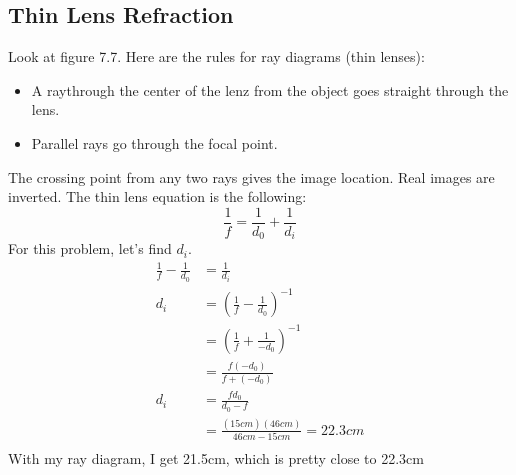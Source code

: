     \subsection{Thin Lens Refraction}
    Look at figure 7.7. Here are the rules for ray diagrams (thin lenses):
    \begin{itemize}
        \item A raythrough the center of the lenz from the object goes straight through the lens.
        \item Parallel rays go through the focal point.
    \end{itemize}
    The crossing point from any two rays gives the image location. Real images are inverted. The thin lens equation is the following:
    \begin{equation*}
        \frac{1}{f}=\frac{1}{d_0}+\frac{1}{d_i}
    \end{equation*}
    For this problem, let's find $d_i$.
    \begin{align*}
        \frac{1}{f}-\frac{1}{d_0}&=\frac{1}{d_i}\\
        d_i&=\left(\frac{1}{f}-\frac{1}{d_0}\right)^{-1}\\
        &=\left(\frac{1}{f}+\frac{1}{-d_0}\right)^{-1}\\
        &=\frac{f(-d_0)}{f+(-d_0)}\\
        d_i&=\frac{fd_0}{d_0-f}\\
        &=\frac{(15cm)(46cm)}{46cm-15cm}=22.3cm\\
    \end{align*}
    With my ray diagram, I get 21.5cm, which is pretty close to 22.3cm
